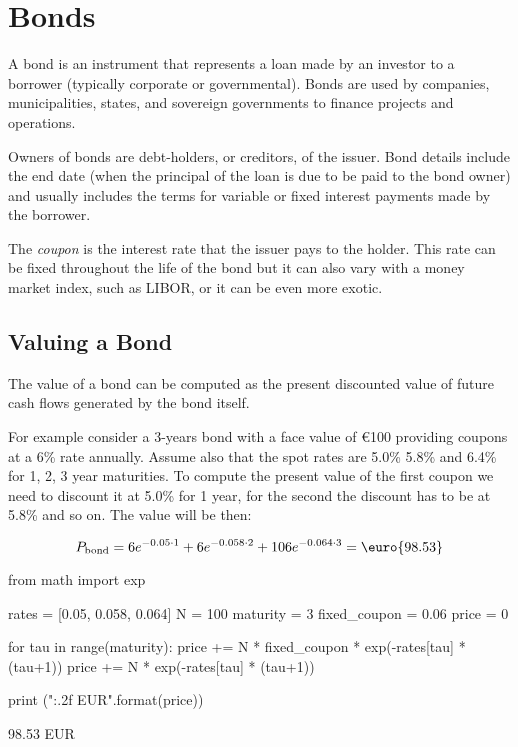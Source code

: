 \chapter{Bonds}
\label{bonds}

A bond is an instrument that represents a loan made by an investor to a borrower (typically corporate or governmental). Bonds are used by companies, municipalities, states, and sovereign governments to finance projects and operations. 

Owners of bonds are debt-holders, or creditors, of the issuer. Bond details include the end date (when the principal of the loan is due to be paid to the bond owner) and usually includes the terms for variable or fixed interest payments made by the borrower.

The \emph{coupon} is the interest rate that the issuer pays to the holder. This rate can be fixed throughout the life of the bond but it can also vary with a money market index, such as LIBOR, or it can be even more exotic.

\section{Valuing a Bond}
\label{sec:bond_pricing}

The value of a bond can be computed as the present discounted value of future cash flows generated by the bond itself.

For example consider a 3-years bond with a face value of \euro{100} providing coupons at a 6\% rate annually. Assume also that the spot rates are 5.0\% 5.8\% and 6.4\% for 1, 2, 3 year maturities. To compute the present value of the first coupon we need to discount it at 5.0\% for 1 year, for the second the discount has to be at 5.8\% and so on. The value will be then:

\[P_{\mathrm{bond}}=6e^{-0.05\cdot 1}+6e^{-0.058\cdot 2}+106e^{-0.064\cdot 3} = \textrm{\euro{98.53}}\]

\begin{ipython}
from math import exp

rates = [0.05, 0.058, 0.064]
N = 100
maturity = 3
fixed_coupon = 0.06
price = 0

for tau in range(maturity):
    price += N * fixed_coupon * exp(-rates[tau] * (tau+1))
price += N * exp(-rates[tau] * (tau+1))

print ("{:.2f} EUR".format(price))
\end{ipython}
\begin{ioutput}
98.53 EUR
\end{ioutput}

